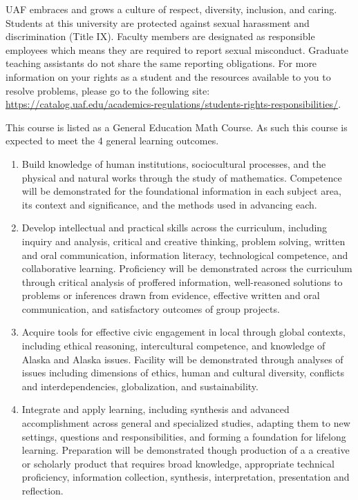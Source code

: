 \documentclass[12pt]{article}
\begin{document}



 UAF embraces and grows a culture of respect, diversity, inclusion, and caring. Students at this university are protected against sexual harassment and discrimination (Title IX). Faculty members are designated as responsible employees which means they are required to report sexual misconduct. Graduate teaching assistants do not share the same reporting obligations. For more information on your rights as a student and the resources available to you to resolve problems, please go to the following site: \url{https://catalog.uaf.edu/academics-regulations/students-rights-responsibilities/}.

 This course is listed as a General Education Math Course. As such this course is expected to meet the 4 general learning outcomes. 

\begin{enumerate}
\item Build knowledge of human institutions, sociocultural processes, and the physical and natural works through the study of mathematics.  Competence will be demonstrated for the foundational information in each subject area, its context and significance, and the methods used in advancing each.

\item Develop intellectual and practical skills across the curriculum, including inquiry and analysis, critical and creative thinking, problem solving, written and oral communication, information literacy, technological competence, and collaborative learning. Proficiency will be demonstrated across the curriculum through critical analysis of proffered information, well-reasoned solutions to problems or inferences drawn from evidence, effective written and oral communication, and satisfactory outcomes of group projects.

\item Acquire tools for effective civic engagement in local through global contexts, including ethical reasoning, intercultural competence, and knowledge of Alaska and Alaska issues.  Facility will be demonstrated through analyses of issues including dimensions of ethics, human and cultural diversity, conflicts and interdependencies, globalization, and sustainability.   

\item Integrate and apply learning, including synthesis and advanced accomplishment across general and specialized studies, adapting them to new settings, questions and responsibilities, and forming a foundation for lifelong learning. Preparation will be demonstrated though production of a a creative or scholarly product that requires broad knowledge, appropriate technical proficiency, information collection, synthesis, interpretation, presentation and reflection.
\end{enumerate}
\end{document}
